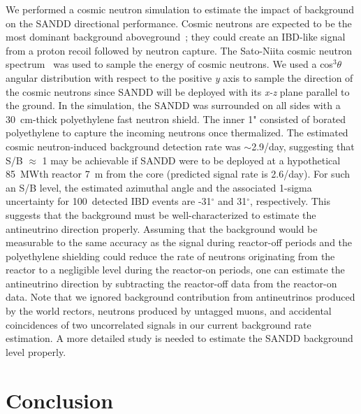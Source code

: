 \documentclass[final,5p,times,twocolumn]{elsarticle}
\begin{document}
We performed a cosmic neutron simulation to estimate the impact of background on the SANDD directional performance. 
Cosmic neutrons are expected to be the most dominant background aboveground~\cite{prospect2020}; they could create an IBD-like signal from a proton recoil followed by neutron capture. The Sato-Niita cosmic neutron spectrum~\cite{satoNiita} was used to sample the energy of cosmic neutrons. We used a cos$^3\theta$~\cite{preszler} angular distribution with respect to the positive \textit{y} axis to sample the direction of the cosmic neutrons since SANDD will be deployed with its \textit{x-z} plane parallel to the ground. In the simulation, the SANDD was surrounded on all sides with a 30~cm-thick polyethylene fast neutron shield. The inner 1" consisted of borated polyethylene to capture the incoming neutrons once thermalized. 
The estimated cosmic neutron-induced background detection rate was $\sim$2.9/day, suggesting that S/B $\approx$ 1 may be achievable if SANDD were to be deployed at a hypothetical 85~MWth reactor 7~m from the core (predicted signal rate is 2.6/day). For such an S/B level, the estimated azimuthal angle and the associated 1-sigma uncertainty for 100~detected IBD events are -31$^\circ$ and 31$^\circ$, respectively. This suggests that the background must be well-characterized to estimate the antineutrino direction properly.
Assuming that the background would be measurable to the same accuracy as the signal during reactor-off periods and the polyethylene shielding could reduce the rate of neutrons originating from the reactor to a negligible level during the reactor-on periods, one can estimate the antineutrino direction by subtracting the reactor-off data from the reactor-on data.
Note that we ignored background contribution from antineutrinos produced by the world rectors, neutrons produced by untagged muons, and accidental coincidences of two uncorrelated signals in our current background rate estimation. A more detailed study is needed to estimate the SANDD background level properly.

\section{Conclusion}
\end{document}
